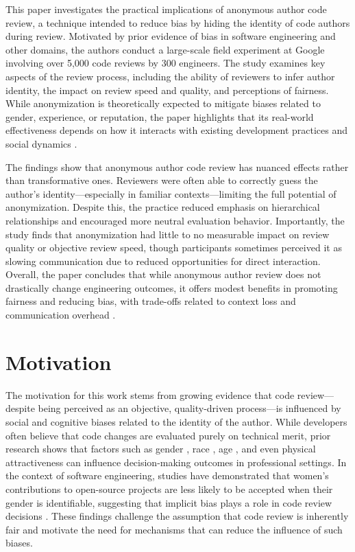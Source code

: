 This paper investigates the practical implications of anonymous author code review, a technique intended to reduce bias by hiding the identity of code authors during review. Motivated by prior evidence of bias in software engineering and other domains, the authors conduct a large-scale field experiment at Google involving over 5,000 code reviews by 300 engineers. The study examines key aspects of the review process, including the ability of reviewers to infer author identity, the impact on review speed and quality, and perceptions of fairness. While anonymization is theoretically expected to mitigate biases related to gender, experience, or reputation, the paper highlights that its real-world effectiveness depends on how it interacts with existing development practices and social dynamics .

The findings show that anonymous author code review has nuanced effects rather than transformative ones. Reviewers were often able to correctly guess the author’s identity—especially in familiar contexts—limiting the full potential of anonymization. Despite this, the practice reduced emphasis on hierarchical relationships and encouraged more neutral evaluation behavior. Importantly, the study finds that anonymization had little to no measurable impact on review quality or objective review speed, though participants sometimes perceived it as slowing communication due to reduced opportunities for direct interaction. Overall, the paper concludes that while anonymous author review does not drastically change engineering outcomes, it offers modest benefits in promoting fairness and reducing bias, with trade-offs related to context loss and communication overhead .

\section{Motivation}
The motivation for this work stems from growing evidence that code review—despite being perceived as an objective, quality-driven process—is influenced by social and cognitive biases related to the identity of the author. While developers often believe that code changes are evaluated purely on technical merit, prior research shows that factors such as gender \cite{terrell2017gender,davison2000sex}, race \cite{greenhaus1990effects}, age \cite{gordon2004age}, and even physical attractiveness \cite{hosoda2003effects} can influence decision-making outcomes in professional settings. In the context of software engineering, studies have demonstrated that women’s contributions to open-source projects are less likely to be accepted when their gender is identifiable, suggesting that implicit bias plays a role in code review decisions \cite{terrell2017gender}. These findings challenge the assumption that code review is inherently fair and motivate the need for mechanisms that can reduce the influence of such biases.

